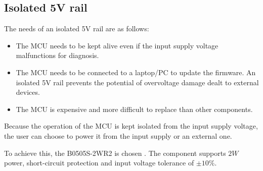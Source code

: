 \documentclass[../main.tex]{subfiles}
\begin{document}
    \pagebreak
    \subsection{Isolated 5V rail}
    \justify
    The needs of an isolated 5V rail are as follows:
    \begin{itemize}
        \item The MCU needs to be kept alive even if the input supply voltage malfunctions for diagnosis.
        \item The MCU needs to be connected to a laptop/PC to update the firmware. An isolated 5V rail prevents the potential of overvoltage damage dealt to external devices.
        \item The MCU is expensive and more difficult to replace than other components.
    \end{itemize}

    \justify
    Because the operation of the MCU is kept isolated from the input supply voltage, the user can choose to power it from the input supply or an external one.

    \justify
    To achieve this, the B0505S-2WR2 is chosen \cite{B0505}. The component supports $2W$ power, short-circuit protection and input voltage tolerance of $\pm 10 \%$.
\end{document}
